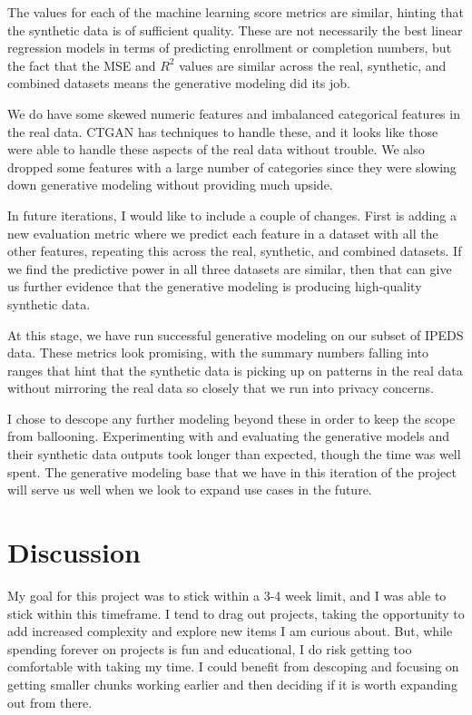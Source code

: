 \documentclass[sigconf, authorversion, nonacm]{acmart}
\begin{document}
    The values for each of the machine learning score metrics are similar, hinting that the synthetic data is of sufficient quality. These are not necessarily the best linear regression models in terms of predicting enrollment or completion numbers, but the fact that the MSE and $R^2$ values are similar across the real, synthetic, and combined datasets means the generative modeling did its job.

    We do have some skewed numeric features and imbalanced categorical features in the real data. CTGAN has techniques to handle these, and it looks like those were able to handle these aspects of the real data without trouble. We also dropped some features with a large number of categories since they were slowing down generative modeling without providing much upside.

    In future iterations, I would like to include a couple of changes. First is adding a new evaluation metric where we predict each feature in a dataset with all the other features, repeating this across the real, synthetic, and combined datasets. If we find the predictive power in all three datasets are similar, then that can give us further evidence that the generative modeling is producing high-quality synthetic data.

    At this stage, we have run successful generative modeling on our subset of IPEDS data. These metrics look promising, with the summary numbers falling into ranges that hint that the synthetic data is picking up on patterns in the real data without mirroring the real data so closely that we run into privacy concerns.

    I chose to descope any further modeling beyond these in order to keep the scope from ballooning. Experimenting with and evaluating the generative models and their synthetic data outputs took longer than expected, though the time was well spent. The generative modeling base that we have in this iteration of the project will serve us well when we look to expand use cases in the future.

\section{Discussion}
    My goal for this project was to stick within a 3-4 week limit, and I was able to stick within this timeframe. I tend to drag out projects, taking the opportunity to add increased complexity and explore new items I am curious about. But, while spending forever on projects is fun and educational, I do risk getting too comfortable with taking my time. I could benefit from descoping and focusing on getting smaller chunks working earlier and then deciding if it is worth expanding out from there.
\end{document}
